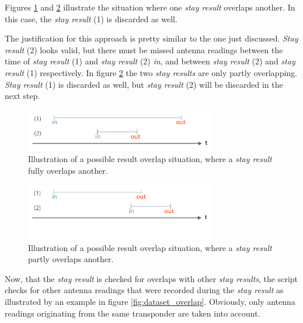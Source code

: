 Figures \ref{fig:result_overlap_single} and \ref{fig:result_overlap_single_shifted} illustrate the situation where one \textit{stay result} overlaps another. In this case, the \textit{stay result} (1) is discarded as well.

The justification for this approach is pretty similar to the one just discussed. \textit{Stay result} (2) looks valid, but there must be missed antenna readings between the time of \textit{stay result} (1) and \textit{stay result} (2) \textit{in}, and between \textit{stay result} (2) and \textit{stay result} (1) respectively. In figure \ref{fig:result_overlap_single_shifted} the two \textit{stay results} are only partly overlapping. \textit{Stay result} (1) is discarded as well, but \textit{stay result} (2) will be discarded in the next step.      

\begin{figure}[htpb]
\begin{center}
  \includegraphics[width=0.75\textwidth]{assets/pdf/result_overlaps_single_schema.pdf}
  \caption[Single result full overlap situation]{Illustration of a possible result overlap situation, where a \textit{stay result} fully overlaps another.}
  \label{fig:result_overlap_single}
\end{center}
\end{figure} 

\begin{figure}[htpb]
\begin{center}
  \includegraphics[width=0.75\textwidth]{assets/pdf/result_overlaps_single_shifted_schema.pdf}
  \caption[Single result partly overlap situation]{Illustration of a possible result overlap situation, where a \textit{stay result} partly overlaps another.}
  \label{fig:result_overlap_single_shifted}
\end{center}
\end{figure}

Now, that the \textit{stay result} is checked for overlaps with other \textit{stay results}, the script checks for other antenna readings that were recorded during the \textit{stay result} as illustrated by an example in figure \ref{fig:dataset_overlap}. Obviously, only antenna readings originating from the same transponder are taken into account.

